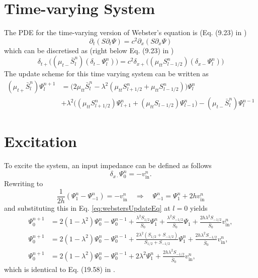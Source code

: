 \documentclass[dvipsnames]{article}
\def\dxp{\delta_{x+}}
\def\dxm{\delta_{x-}}
\def\Sp{S_{l+1/2}}
\def\Sm{S_{l-1/2}}
\def\Psilp{\Psi_{l+1}^n}
\def\Psilm{\Psi_{l-1}^n}
\def\Psinp{\Psi_l^{n+1}}
\def\Psinm{\Psi_l^{n-1}}
\def\Psiln{\Psi_l^n}
\def\muTT{\mu_{tt}}
\begin{document}
\section{Time-varying System}
The PDE for the time-varying version of Webster's equation is (Eq. (9.23) in \cite{Bilbao2009})
\begin{equation}
     \partial_t(S\partial_t\Psi) = c^2 \partial_x(S\partial_x\Psi)
\end{equation}
which can be discretised as (right below Eq. (9.23) in \cite{Bilbao2009})
\begin{equation}
    \delta_{t+}\big((\mu_{t-}\bar S_l^n)(\delta_{t-}\Psiln)\big) = c^2\dxp\big((\muTT \Sm^n)(\dxm\Psiln)\big)
\end{equation}
The update scheme for this time varying system can be written as
\begin{equation}
    \begin{aligned}
        (\mu_{t+}\bar S_l^n)\Psinp &= \Big(2 \mu_{tt}\bar S_l^n -  \lambda^2(\muTT \Sp^n + \muTT \Sm^n)\Big) \Psiln \\
        &+ \lambda^2 \Big((\muTT \Sp^n)\Psilp + (\muTT\Sm)\Psilm\Big) - (\mu_{t-}\bar S_l^n)\Psinm
    \end{aligned}
\end{equation}

\section{Excitation}
To excite the system, an input impedance can be defined as follows
\begin{equation}
\delta_{x\cdot}\Psi_0^n = -v_\text{in}^n.
\end{equation} 
Rewriting to
\begin{equation}
    \frac{1}{2h}(\Psi_1^n-\Psi_{-1}^n) = -v_\text{in}^n \quad \Rightarrow \quad \Psi_{-1}^n = \Psi_1^n + 2hv_\text{in}^n
\end{equation}
and substituting this in Eq. \eqref{eq:webstersUpdateEq} at $l=0$ yields
\begin{align}
    \Psi_0^{n+1}&= 2(1-\lambda^2)\Psi_0^n-\Psi_0^{n-1}+ \frac{\lambda^2S_{1/2}}{\bar S_0}\Psi_1^n + \frac{\lambda^2S_{-1/2}}{\bar S_0}\Psi_1 + \frac{2h\lambda^2S_{-1/2}}{\bar S_0}v_\text{in}^n,\nonumber\\
    \Psi_0^{n+1}&= 2(1-\lambda^2)\Psi_0^n-\Psi_0^{n-1}+ \frac{2\lambda^2(S_{1/2}+S_{-1/2})}{S_{1/2}+S_{-1/2}}\Psi_1^n+ \frac{2h\lambda^2S_{-1/2}}{\bar S_0}v_\text{in}^n,\nonumber\\
    \Psi_0^{n+1}&= 2(1-\lambda^2)\Psi_0^n-\Psi_0^{n-1}+ 2\lambda^2\Psi_1^n+ \frac{2h\lambda^2S_{-1/2}}{\bar S_0}v_\text{in}^n,
\end{align}
which is identical to Eq. (19.58) in \cite{Bilbao2018}.
\end{document}
